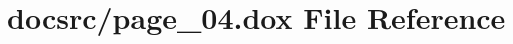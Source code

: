 \hypertarget{page__04_8dox}{\section{docsrc/page\-\_\-04.dox File Reference}
\label{page__04_8dox}
}
